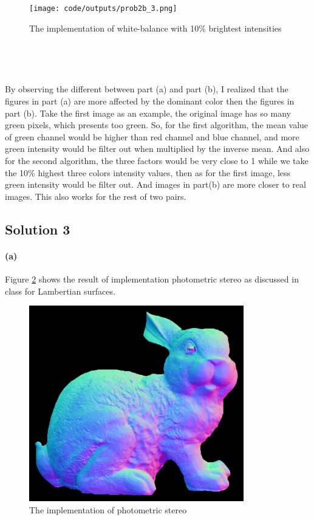 \documentclass{article}
\newcommand{\solution}[1]{\clearpage \subsection*{Solution #1}}
\newcommand{\spart}[1]{\paragraph{(#1)}}
\begin{document}
\begin{figure}[!h]
  \centering
    \texttt{[image: code/outputs/prob2b\_3.png]}
  \caption{The implementation of white-balance with 10\% brightest intensities}
  \label{fig:prob2b3}
\end{figure}

\

\

 By observing the different between part (a) and part (b), I realized that the figures in part (a) are more affected by the dominant color then the figures in part (b). Take the first image as an example, the original image has so many green pixels, which presents too green. So, for the first algorithm, the mean value of green channel would be higher than red channel and blue channel, and more green intensity would be filter out when multiplied by the inverse mean. And also for the second algorithm, the three factors would be very close to 1 while we take the 10\% highest three colors intensity values, then as for the first image, less green intensity would be filter out. And images in part(b) are more closer to real images. This also works for the rest of two pairs.
 
 \solution{3}
 \spart{a} Figure \ref{fig:prob3a} shows the result of implementation photometric stereo as discussed in class for Lambertian surfaces.
 \begin{figure}[!h]
  \centering
    \includegraphics[height=23em]{code/outputs/prob3_nrm.png}
  \caption{The implementation of photometric stereo}
  \label{fig:prob3a}
\end{figure}
\end{document}
